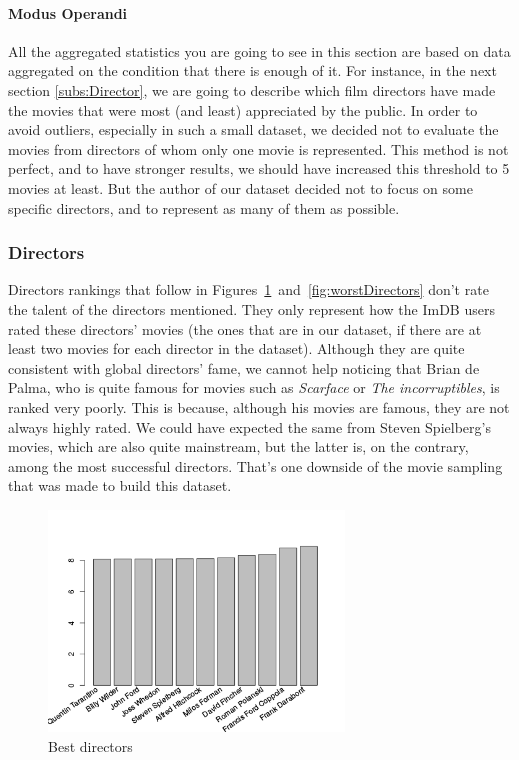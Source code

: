 \paragraph{Modus Operandi}
\label{par:ModusOperandi}
All the aggregated statistics you are going to see in this section are based on data aggregated on the condition that there is enough of it.
For instance, in the next section \ref{subs:Director}, we are going to describe which film directors have made the movies that were most (and least) appreciated by the public.
In order to avoid outliers, especially in such a small dataset, we decided not to evaluate the movies from directors of whom only one movie is represented.
This method is not perfect, and to have stronger results, we should have increased this threshold to 5 movies at least.
But the author of our dataset decided not to focus on some specific directors, and to represent as many of them as possible.

\subsubsection{Directors}
\label{subs:Directors}

Directors rankings that follow in Figures~\ref{fig:bestDirectors}~and~\ref{fig:worstDirectors} don't rate the talent of the directors mentioned.
They only represent how the ImDB users rated these directors' movies (the ones that are in our dataset, if there are at least two movies for each director in the dataset).
Although they are quite consistent with global directors' fame, we cannot help noticing that Brian de Palma, who is quite famous for movies such as \textit{Scarface} or \textit{The incorruptibles}, is ranked very poorly.
This is because, although his movies are famous, they are not always highly rated.
We could have expected the same from Steven Spielberg's movies, which are also quite mainstream, but the latter is, on the contrary, among the most successful directors.
That's one downside of the movie sampling that was made to build this dataset.

\begin{figure}[!h]
\begin{center}
\includegraphics[width=0.70\textwidth]{../src/pre-processing/stats/results/bestDirectors.png}
\end{center}
\caption{Best directors}
\label{fig:bestDirectors}
\end{figure}

